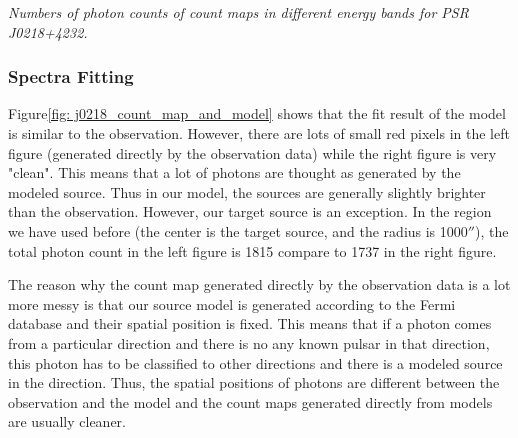 \documentclass[12pt]{report}
\newcommand{\mycaption}[1]{\caption{\textit{\footnotesize #1}}}
\begin{document}
          \begin{table}[!h]   
            \centering
            \mycaption{Numbers of photon counts of count maps in different energy bands for PSR J0218+4232.}
            \label{table:j0218_ccube_photon_counts}
          \end{table}
          \subsubsection{Spectra Fitting}
            Figure\ref{fig: j0218_count_map_and_model} shows that the fit result of the model 
            is similar to the observation. However, 
            there are lots of small red pixels in the left figure (generated directly by the observation data) while the 
            right figure is very "clean". This means that a lot of photons are thought as generated by the modeled 
            source. Thus in our model, the sources are generally slightly brighter than the observation. However, our target
            source is an exception. In the region we have used before (the center is the target source, and the radius is
            1000$''$), the total photon count in the left figure is 1815 compare to 1737 in the right figure. 

            The reason why the count map generated directly by the observation data is a lot more messy is that our source 
            model is generated according to the Fermi database and their spatial position is fixed. This means that if 
            a photon comes from a particular direction and there is no any known pulsar in that direction, this 
            photon has to be classified to other directions and there is a modeled source in the direction.  
            Thus, the spatial positions of photons are different between the observation and the model and 
            the count maps generated directly from models are usually cleaner. 
            
\end{document}
